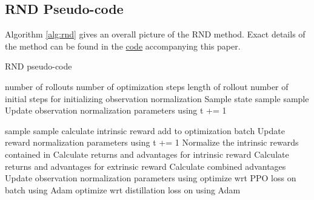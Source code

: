 \documentclass{article} \usepackage[dvipsnames]{xcolor}
\begin{document}
\subsection{RND Pseudo-code}
Algorithm \ref{alg:rnd} gives an overall picture of the RND method. Exact details of the method can be found in the \href{https://github.com/openai/random-network-distillation}{code} accompanying this paper.
\begin{algorithm}[!ht]
    \caption{RND pseudo-code}
    \label{alg:rnd}
    \begin{algorithmic}
        \STATE   number of rollouts
        \STATE  number of optimization steps
        \STATE  length of rollout
        \STATE  number of initial steps for initializing observation normalization 
        \STATE  
        \STATE Sample state 
            \STATE sample 
            \STATE sample 
            \STATE Update observation normalization parameters using 
            \STATE t += 1
            
        \ENDFOR
               \STATE sample 
               \STATE sample 
               \STATE calculate intrinsic reward 
               \STATE add  to optimization batch 
               \STATE Update reward normalization parameters using 
               \STATE t += 1
            \ENDFOR
            \STATE Normalize the intrinsic rewards contained in 
            \STATE Calculate returns  and advantages  for intrinsic reward
            \STATE Calculate returns  and advantages  for extrinsic reward
            \STATE Calculate combined advantages 
            \STATE Update observation normalization parameters using 
            \STATE optimize  wrt PPO loss on batch  using Adam
            \STATE optimize  wrt distillation loss on  using Adam
            \ENDFOR
        \ENDFOR
    \end{algorithmic}
    \end{algorithm}
\end{document}
